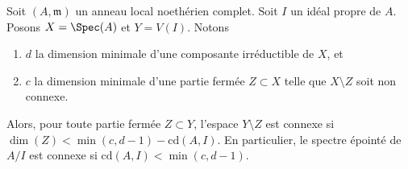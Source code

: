 \begin{lemma}
\label{lemma-punctured-still-connected}
\begin{reference}
\cite[Theorem 1.6]{Varbaro}
\end{reference}
Soit $(A, \mathfrak m)$ un anneau local noethérien complet.
Soit $I$ un idéal propre de $A$.
Posons $X = \Spec(A)$ et $Y = V(I)$.
Notons
\begin{enumerate}
\item $d$ la dimension minimale d'une composante irréductible de $X$, et
\item $c$ la dimension minimale d'une partie fermée $Z \subset X$
telle que $X \setminus Z$ soit non connexe.
\end{enumerate}
Alors, pour toute partie fermée $Z \subset Y$, l'espace $Y \setminus Z$ est connexe si
$\dim(Z) < \min(c, d - 1) - \text{cd}(A, I)$. En particulier, le spectre
épointé de $A/I$ est connexe si $\text{cd}(A, I) < \min(c, d - 1)$.
\end{lemma}

